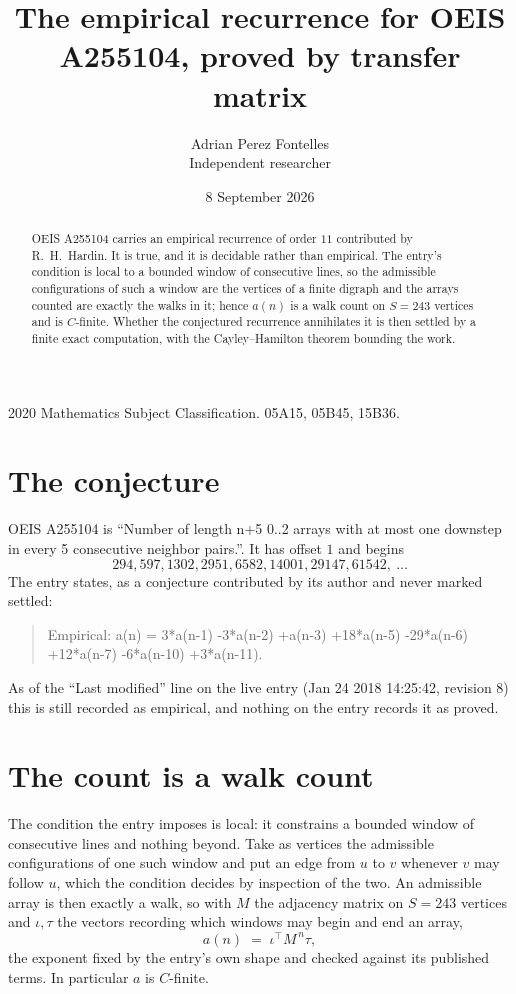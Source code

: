 \documentclass[11pt,a4paper]{article}
\title{The empirical recurrence for OEIS A255104, proved by transfer matrix}
\author{Adrian Perez Fontelles\\ \small Independent researcher}
\date{8 September 2026}
\theoremstyle{plain}
\theoremstyle{definition}
\begin{document}
\maketitle

\begin{abstract}
OEIS A255104 carries an empirical recurrence of order $11$ contributed by R.~H.~Hardin. It is
true, and it is decidable rather than empirical. The entry's condition is local to a bounded window of consecutive lines, so
the admissible configurations of such a window are the vertices of a finite digraph and the
arrays counted are exactly the walks in it; hence $a(n)$ is a walk count on $S=243$ vertices
and is $C$-finite. Whether the conjectured recurrence annihilates it is then settled by a
finite exact computation, with the Cayley--Hamilton theorem bounding the work.
\end{abstract}

\noindent\small 2020 Mathematics Subject Classification. 05A15, 05B45, 15B36.\normalsize

\section{The conjecture}

OEIS A255104 is ``Number of length n+5 0..2 arrays with at most one downstep in every 5 consecutive neighbor pairs.''. It has offset $1$ and begins
\[
294, 597, 1302, 2951, 6582, 14001, 29147, 61542,\ \dots
\]
The entry states, as a conjecture contributed by its author and never marked settled:
\begin{quote}
Empirical: a(n) = 3*a(n-1) -3*a(n-2) +a(n-3) +18*a(n-5) -29*a(n-6) +12*a(n-7) -6*a(n-10) +3*a(n-11).
\end{quote}
As of the ``Last modified'' line on the live entry (Jan 24 2018 14:25:42, revision 8) this is still
recorded as empirical, and nothing on the entry records it as proved.

\section{The count is a walk count}

The condition the entry imposes is local: it constrains a bounded window of consecutive lines and nothing beyond. Take as
vertices the admissible configurations of one such window and put an edge from $u$ to $v$
whenever $v$ may follow $u$, which the condition decides by inspection of the two. An
admissible array is then exactly a walk, so with $M$ the adjacency matrix on $S=243$ vertices
and $\iota,\tau$ the vectors recording which windows may begin and end an array,
\[
a(n)\;=\;\iota^{\!\top}M^{\,n}\tau ,
\]
the exponent fixed by the entry's own shape and checked against its published terms. In
particular $a$ is $C$-finite.
\end{document}
